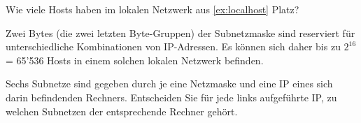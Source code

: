 \begin{myexercise}
Wie viele Hosts haben im lokalen Netzwerk aus \cref{ex:localhost} Platz?
\begin{myanswer}
Zwei Bytes (die zwei letzten Byte-Gruppen) der Subnetzmaske sind reserviert für unterschiedliche Kombinationen von \gls{IP}-Adressen. Es können sich daher bis zu $2^{16}$ = 65'536 Hosts in einem solchen lokalen Netzwerk befinden.
\end{myanswer}
\end{myexercise}

\begin{myexercise}
Sechs Subnetze sind gegeben durch je eine Netzmaske und eine IP eines sich darin befindenden Rechners. Entscheiden Sie für jede links aufgeführte IP, zu welchen Subnetzen der entsprechende Rechner gehört.\vspace{-.2cm}


\end{myexercise}
